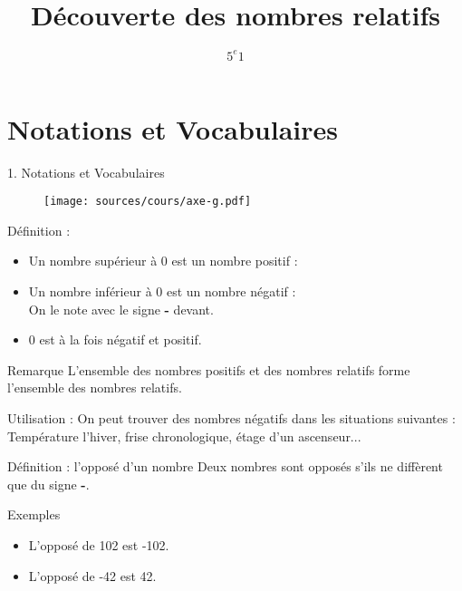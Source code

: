 \documentclass{beamer}
\title{Découverte des nombres relatifs}
\author{$5^{e}1$}
\begin{document}
\frame{\titlepage}

\section{Notations et Vocabulaires}


\frame{\tableofcontents[sectionstyle=show/shaded, subsectionstyle=show/shaded]}

\begin{frame}
  1. Notations et Vocabulaires

  \begin{figure}[H]
    \centering
    \texttt{[image: sources/cours/axe-g.pdf]}
  \end{figure}

  \begin{alertblock}{Définition :}	
    \begin{itemize}
    \item Un nombre supérieur à 0 est un nombre positif :  
    \item Un nombre inférieur à 0 est un nombre négatif :\\
      On le note avec le signe \textbf{-} devant.
    \item 0 est à la fois négatif et positif.
    \end{itemize}
  \end{alertblock}
  
  \begin{exampleblock}{Remarque}
    L'ensemble des nombres positifs et des nombres relatifs forme l'ensemble des nombres relatifs.
  \end{exampleblock}
\end{frame}

\begin{frame}
      {
        \begin{block}{Utilisation :}	
          On peut trouver des nombres négatifs dans les situations suivantes :\\
          Température l'hiver, frise chronologique, étage d'un ascenseur...
        \end{block}
      }
          {
            \begin{alertblock}{Définition : l'opposé d'un nombre}	
              Deux nombres sont opposés s'ils ne diffèrent que du signe \textbf{-}.
            \end{alertblock}

            \begin{exampleblock}{Exemples}
	      \begin{itemize}
              \item L'opposé de 102 est -102.
	      \item L'opposé de -42 est 42.
	      \end{itemize}
            \end{exampleblock}
          }
\end{frame}
\end{document}
